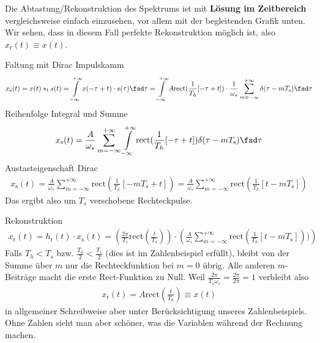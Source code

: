 \begin{Loesung}
%
Die Abtastung/Rekonstruktion des Spektrums ist mit \textbf{Lösung im Zeitbereich}
vergleichsweise einfach einzusehen, vor allem mit der begleitenden Grafik unten.
Wir sehen, dass in diesem Fall perfekte Rekonstruktion möglich ist, also
$x_\mathrm{r}(t) \equiv x(t)$.

\noindent Faltung mit Dirac Impulskamm
\begin{align}
x_\mathrm{s}(t) = x(t) \ast_t s(t) = \int\limits_{-\infty}^{+\infty} x(-\tau+t) \cdot s(\tau) \fsd\tau
= \int\limits_{-\infty}^{+\infty} A \mathrm{rect}(\frac{1}{T_h}[-\tau + t]) \cdot \frac{1}{\omega_s} \sum_{m=-\infty}^{+\infty} \delta(\tau-m T_\mathrm{s}) \fsd\tau
\end{align}
Reihenfolge Integral und Summe
\begin{align}
x_\mathrm{s}(t) = \frac{A}{\omega_s} \sum_{m=-\infty}^{+\infty} \int\limits_{-\infty}^{+\infty} \mathrm{rect}(\frac{1}{T_h}[-\tau + t]) \delta(\tau-m T_\mathrm{s}) \fsd\tau
\end{align}
Austasteigenschaft Dirac
\begin{align}
x_\mathrm{s}(t)
= \frac{A}{\omega_s} \sum_{m=-\infty}^{+\infty} \mathrm{rect}(\frac{1}{T_h}[-m T_\mathrm{s} + t])
= \frac{A}{\omega_s} \sum_{m=-\infty}^{+\infty} \mathrm{rect}(\frac{1}{T_h}[t - m T_\mathrm{s}])
\end{align}
Das ergibt also um $T_s$ verschobene Rechteckpulse.

\noindent Rekonstruktion
\begin{align}
x_\mathrm{r}(t) = h_\mathrm{r}(t) \cdot x_\mathrm{s}(t) =
\left(\frac{2\pi}{T_s}\mathrm{rect}(\frac{t}{T_s})\right) \cdot
\left(\frac{A}{\omega_s} \sum_{m=-\infty}^{+\infty} \mathrm{rect}(\frac{1}{T_h}[t - m T_\mathrm{s}]))\right)
\end{align}
Falls $T_h < T_s$ bzw. $\frac{T_h}{2} < \frac{T_s}{2}$
(dies ist im Zahlenbeispiel erfüllt),
bleibt von der Summe über $m$ nur die Rechteckfunktion bei $m=0$ übrig.
Alle anderen $m$-Beiträge macht die erste Rect-Funktion zu Null.
%
Weil $\frac{2\pi}{T_s \omega_s} = \frac{2\pi}{2\pi} = 1$ verbleibt also
\begin{align}
x_\mathrm{r}(t) = A \mathrm{rect}(\frac{t}{T_h}) \equiv x(t)
\end{align}
in allgemeiner Schreibweise aber unter Berücksichtigung unseres Zahlenbeispiels.
Ohne Zahlen sieht man aber schöner, was die Variablen während der Rechnung machen.


\end{Loesung}
